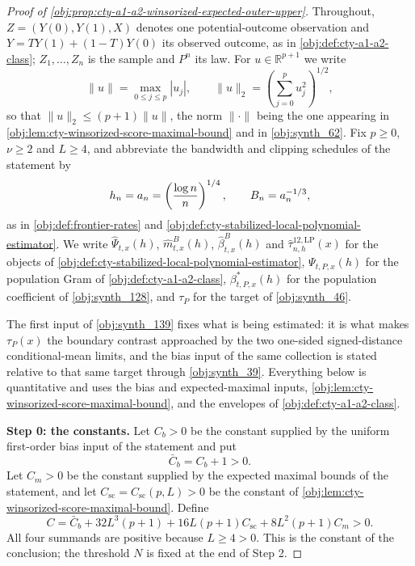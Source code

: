 \begin{proof}[Proof of \cref{obj:prop:cty-a1-a2-winsorized-expected-outer-upper}]
Throughout, \(Z=(Y(0),Y(1),X)\) denotes one potential-outcome observation and \(Y=TY(1)+(1-T)Y(0)\) its observed outcome, as in \cref{obj:def:cty-a1-a2-class}; \(Z_1,\ldots,Z_n\) is the sample and \(P^n\) its law.  For \(u\in\mathbb R^{p+1}\) we write
\[
\lVert u\rVert=\max_{0\leq j\leq p}|u_j|,
\qquad
\lVert u\rVert_2=\left(\sum_{j=0}^p u_j^2\right)^{1/2},
\]
so that \(\lVert u\rVert_2\leq(p+1)\lVert u\rVert\), the norm \(\lVert\cdot\rVert\) being the one appearing in \cref{obj:lem:cty-winsorized-score-maximal-bound} and in \cref{obj:synth_62}.  Fix \(p\geq0\), \(\nu\geq2\) and \(L\geq4\), and abbreviate the bandwidth and clipping schedules of the statement by
\[
h_n=a_n=\left({\log n\over n}\right)^{1/4},
\qquad
B_n=a_n^{-1/3},
\]
as in \cref{obj:def:frontier-rates} and \cref{obj:def:cty-stabilized-local-polynomial-estimator}.  We write \(\widehat\Psi_{t,x}(h)\), \(\widehat m^B_{t,x}(h)\), \(\widehat\beta^B_{t,x}(h)\) and \(\widehat\tau^{12,\mathrm{LP}}_{n,h}(x)\) for the objects of \cref{obj:def:cty-stabilized-local-polynomial-estimator}, \(\Psi_{t,P,x}(h)\) for the population Gram of \cref{obj:def:cty-a1-a2-class}, \(\beta^*_{t,P,x}(h)\) for the population coefficient of \cref{obj:synth_128}, and \(\tau_P\) for the target of \cref{obj:synth_46}.

The first input of \cref{obj:synth_139} fixes what is being estimated: it is what makes \(\tau_P(x)\) the boundary contrast approached by the two one-sided signed-distance conditional-mean limits, and the bias input of the same collection is stated relative to that same target through \cref{obj:synth_39}.  Everything below is quantitative and uses the bias and expected-maximal inputs, \cref{obj:lem:cty-winsorized-score-maximal-bound}, and the envelopes of \cref{obj:def:cty-a1-a2-class}.

\textbf{Step 0: the constants.}  Let \(C_b>0\) be the constant supplied by the uniform first-order bias input of the statement and put
\[
\bar C_b=C_b+1>0 .
\]
Let \(C_m>0\) be the constant supplied by the expected maximal bounds of the statement, and let \(C_{\mathrm{sc}}=C_{\mathrm{sc}}(p,L)>0\) be the constant of \cref{obj:lem:cty-winsorized-score-maximal-bound}.  Define
\[
C
=
\bar C_b+32L^3(p+1)+16L(p+1)C_{\mathrm{sc}}+8L^2(p+1)C_m
>0 .
\]
All four summands are positive because \(L\geq4>0\).  This is the constant of the conclusion; the threshold \(N\) is fixed at the end of Step 2.


\end{proof}
